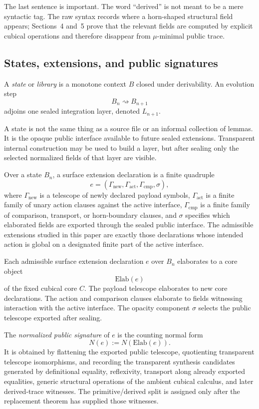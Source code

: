 \documentclass{lmcs}
\begin{document}
The last sentence is important.  The word ``derived'' is not meant to be a mere syntactic tag.
The raw syntax records where a horn-shaped structural field appears; Sections~4 and~5 prove
that the relevant fields are computed by explicit cubical operations and therefore disappear
from \(\mu\)-minimal public trace.

\subsection{States, extensions, and public signatures}

\begin{defi}[State]
A \emph{state} or \emph{library} is a monotone context \(B\) closed under derivability.  An
evolution step
\[
  B_n \rightsquigarrow B_{n+1}
\]
adjoins one sealed integration layer, denoted \(L_{n+1}\).
\end{defi}

A state is not the same thing as a source file or an informal collection of lemmas.  It is the
opaque public interface available to future sealed extensions.  Transparent internal
construction may be used to build a layer, but after sealing only the selected normalized
fields of that layer are visible.

\begin{defi}
Over a state \(B_n\), a surface extension declaration is a finite quadruple
\[
  e=(\Gamma_{\mathrm{new}},\Gamma_{\mathrm{act}},\Gamma_{\mathrm{cmp}},\sigma),
\]
where \(\Gamma_{\mathrm{new}}\) is a telescope of newly declared payload symbols,
\(\Gamma_{\mathrm{act}}\) is a finite family of unary action clauses against the active
interface, \(\Gamma_{\mathrm{cmp}}\) is a finite family of comparison, transport, or
horn-boundary clauses, and \(\sigma\) specifies which elaborated fields are exported through
the sealed public interface.  The admissible extensions studied in this paper are exactly
those declarations whose intended action is global on a designated finite part of the active
interface.
\end{defi}

\begin{defi}
Each admissible surface extension declaration \(e\) over \(B_n\) elaborates to a core object
\[
  \mathrm{Elab}(e)
\]
of the fixed cubical core \(C\).  The payload telescope elaborates to new core declarations.
The action and comparison clauses elaborate to fields witnessing interaction with the active
interface.  The opacity component \(\sigma\) selects the public telescope exported after
sealing.

The \emph{normalized public signature} of \(e\) is the counting normal form
\[
  N(e) := N(\mathrm{Elab}(e)).
\]
It is obtained by flattening the exported public telescope, quotienting transparent telescope
isomorphisms, and recording the transparent synthesis candidates generated by definitional
equality, reflexivity, transport along already exported equalities, generic structural
operations of the ambient cubical calculus, and later derived-trace witnesses.  The
primitive/derived split is assigned only after the replacement theorem has supplied those
witnesses.
\end{defi}
\end{document}
